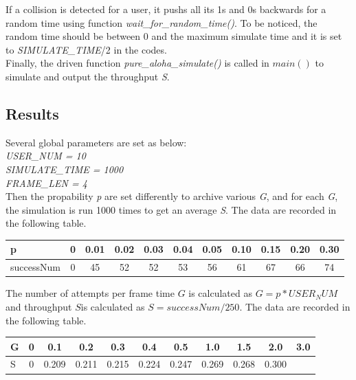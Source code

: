 \documentclass[11pt,a4paper]{report}
\begin{document}
If a collision is detected for a user, it pushs all its 1s and 0s backwards for a random time using function \emph{wait\_for\_random\_time()}. To be noticed, the random time should be between 0 and the maximum simulate time and it is set to \emph{SIMULATE\_TIME}/2 in the codes. \\

Finally, the driven function \emph{pure\_aloha\_simulate()} is called in \(main()\) to simulate and output the throughput \emph{S}.

\subsection*{Results}

Several global parameters are set as below: \\
\emph{USER\_NUM = 10} \\
\emph{SIMULATE\_TIME = 1000} \\
\emph{FRAME\_LEN = 4} \\

Then the propability \emph{p} are set differently to archive various \emph{G}, and for each \emph{G}, the simulation is run 1000 times to get an average \emph{S}. The data are recorded in the following table. \\

\begin{table}[htbp]
\begin{tabular}{lcccccccccc}
\toprule
p & 0 & 0.01 & 0.02  & 0.03 & 0.04 & 0.05 & 0.10 & 0.15 & 0.20 & 0.30 \\
\midrule
successNum & 0 & 45 & 52 & 52 & 53 & 56 & 61 & 67 & 66 & 74 \\
\bottomrule
\end{tabular}
\end{table}

The number of attempts per frame time \(G\) is calculated as \(G = p*USER_NUM\) and throughput \(S\)is calculated as \(S = successNum/250\). The data are recorded in the following table. \\

\begin{table}[htbp]
\begin{tabular}{lcccccccccc}
\toprule
G & 0 & 0.1 & 0.2  & 0.3 & 0.4 & 0.5 & 1.0 & 1.5 & 2.0 & 3.0 \\
\midrule
S & 0 & 0.209 & 0.211 & 0.215 & 0.224 & 0.247 & 0.269 & 0.268 & 0.300 \\
\bottomrule
\end{tabular}
\end{table}
\end{document}
